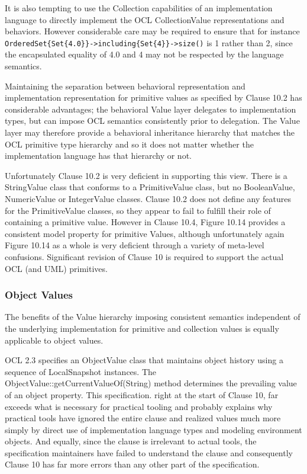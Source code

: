 \documentclass{eceasst}
\begin{document}
It is also tempting to use the Collection capabilities of an implementation language to directly implement the OCL CollectionValue representations and behaviors. However considerable care may be required to ensure that for instance \verb|OrderedSet{Set{4.0}}->including{Set{4}}->size()| is 1 rather than 2, since the encapsulated equality of 4.0 and 4 may not be respected by the language semantics.

Maintaining the separation between behavioral representation and implementation representation for primitive values as specified by Clause 10.2 has considerable advantages; the behavioral Value layer delegates to implementation types, but can impose OCL semantics consistently prior to delegation. The Value layer may therefore provide a behavioral inheritance hierarchy that matches the OCL primitive type hierarchy and so it does not matter whether the implementation language has that hierarchy or not.

Unfortunately Clause 10.2 is very deficient in supporting this view. There is a StringValue class that conforms to a PrimitiveValue class, but no BooleanValue, NumericValue or IntegerValue classes. Clause 10.2  does not define any features for the PrimitiveValue classes, so they appear to fail to fulfill their role of containing a primitive value. However in Clause 10.4, Figure 10.14 provides a consistent model property for primitive Values, although unfortunately again Figure 10.14 as a whole is very deficient through a variety of meta-level confusions. Significant revision of Clause 10 is required to support the actual OCL (and UML) primitives.

\subsubsection{Object Values}

The benefits of the Value hierarchy imposing consistent semantics independent of the underlying implementation for primitive and collection values is equally applicable to object values.

OCL 2.3 specifies an ObjectValue class that maintains object history using a sequence of LocalSnapshot instances. The  ObjectValue::getCurrentValueOf(String) method determines the prevailing value of an object property. This specification. right at the start of Clause 10, far exceeds what is necessary for practical tooling and probably explains why practical tools have ignored the entire clause and realized values  much more simply by direct use of implementation language types and modeling environment objects. And equally, since the clause is irrelevant to actual tools, the specification maintainers have failed to understand the clause and consequently Clause 10 has far more errors than any other part of the specification.
\end{document}
